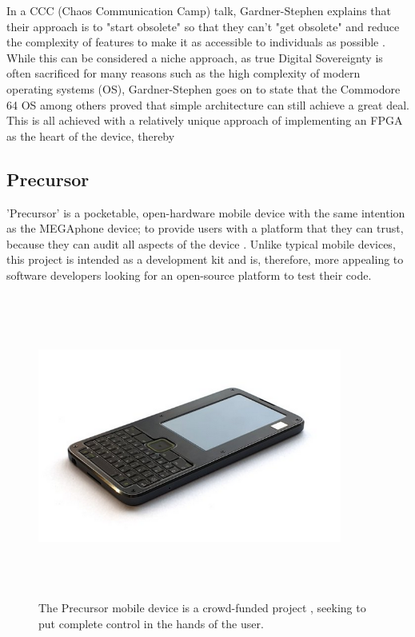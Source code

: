 In a CCC (Chaos Communication Camp) talk, Gardner-Stephen explains that their approach is to "start obsolete" so that they can't "get obsolete" and reduce the complexity of features to make it as accessible to individuals as possible \cite{mobilehistory}.
While this can be considered a niche approach, as true Digital Sovereignty is often sacrificed for many reasons such as the high complexity of modern operating systems (OS), Gardner-Stephen goes on to state that the Commodore 64 OS among others proved that simple architecture can still achieve a great deal.
This is all achieved with a relatively unique approach of implementing an FPGA as the heart of the device, thereby 

\subsection{Precursor}

'Precursor' is a pocketable, open-hardware mobile device with the same intention as the MEGAphone device; to provide users with a platform that they can trust, because they can audit all aspects of the device \cite{precursor}.
Unlike typical mobile devices, this project is intended as a development kit and is, therefore, more appealing to software developers looking for an open-source platform to test their code.

\begin{figure} [h]
    \centering
    \includegraphics[width=10cm,height=10cm,keepaspectratio]{Figures/precursor.png}
    \caption{The Precursor mobile device is a crowd-funded project \cite{precursor}, seeking to put complete control in the hands of the user.}
    \label{fig:Precursor}
\end{figure}

